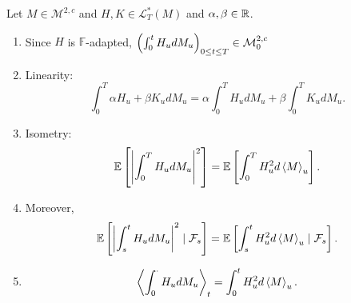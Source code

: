 \begin{prop}
    Let $M \in \mathcal{M}^{2,c}$ and $H,K \in \mathcal{L}^*_T(M)$ and $\alpha,\beta \in \mathbb{R}$.
    \begin{enumerate}[label=(\arabic{*})]
        \item Since $H$ is $\mathbb{F}$-adapted, $\left(\int_0^t H_u dM_u\right)_{0\leq t \leq T} \in \mathcal{M}^{2,c}_0$
        \item Linearity:
        \begin{equation*}
            \int_0^T \alpha H_u + \beta K_u dM_u = \alpha\int_0^T H_u dM_u+\beta\int_0^T K_u dM_u.
        \end{equation*}
        \item Isometry:
        \begin{equation*}
            \mathbb{E}\left[\left\lvert\int_0^T H_u dM_u\right\lvert^2\right] = \mathbb{E}\left[\int_0^T H^2_u d\left\langle M \right\rangle_u\right].
        \end{equation*}
        \item Moreover,
        \begin{equation*}
             \mathbb{E}\left[\left\lvert\int_s^t H_u dM_u\right\lvert^2 \mid \mathcal{F}_s\right] = \mathbb{E}\left[\int_s^t H^2_u d\left\langle M \right\rangle_u \mid \mathcal{F}_s\right].
        \end{equation*}
        \item 
        \begin{equation*}
            \left\langle \int_0^\cdot H_u dM_u \right\rangle_t = \int_0^t H_u^2 d \left\langle M \right\rangle_u.
        \end{equation*}
    \end{enumerate}
\end{prop}

